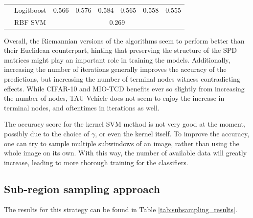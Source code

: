 \documentclass[12pt]{article}
\begin{document}
\begin{sloppypar}
\begin{table}[hbt!]
\begin{tabular}{lllllllll}
                                       & \multicolumn{2}{l}{Logitboost}                            & 0.566                           & 0.576                            & 0.584                            & 0.565                           & 0.558                            & 0.555                            \\
                                       & \multicolumn{2}{l}{RBF SVM}                               & \multicolumn{6}{c}{0.269}                                                                                                                                                                                     \\ \hline
\end{tabular}
\end{table}
\vspace{5mm}
\noindent
Overall, the Riemannian versions of the algorithms seem to perform better than their Euclidean counterpart, hinting that preserving the structure of the SPD matrices might play an important role in training the models. Additionally, increasing the number of iterations generally improves the accuracy of the predictions, but increasing the number of terminal nodes witness contradicting effects. While CIFAR-10 and MIO-TCD benefits ever so slightly from increasing the number of nodes, TAU-Vehicle does not seem to enjoy the increase in terminal nodes, and oftentimes in iterations as well.

\noindent
The accuracy score for the kernel SVM method is not very good at the moment, possibly due to the choice of $\gamma$, or even the kernel itself. To improve the accuracy, one can try to sample multiple subwindows of an image, rather than using the whole image on its own. With this way, the number of available data will greatly increase, leading to more thorough training for the classifiers.

\subsection{Sub-region sampling approach}
The results for this strategy can be found in Table \ref{tab:subsampling_results}.


\end{sloppypar}
\end{document}
